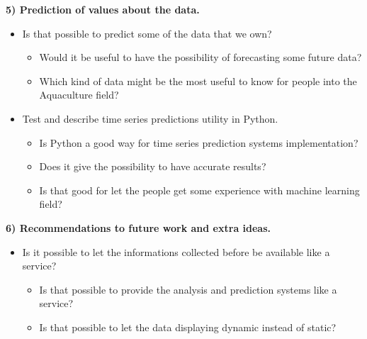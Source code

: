  \newpage
 
\textbf{5) Prediction of values about the data.}
\vspace{-5mm}
\begin{itemize}
 \setlength{\itemsep}{-5pt}
  \item Is that possible to predict some of the data that we own?
		\vspace{-3mm}
		\begin{itemize}
 		\setlength{\itemsep}{-5pt}		
		  \item Would it be useful to have the possibility of forecasting some future data?
		  \item Which kind of data might be the most useful to know for people into the Aquaculture field?
		 \end{itemize}
  \item Test and describe time series predictions utility in Python.
  		\vspace{-3mm}
		\begin{itemize}
 		\setlength{\itemsep}{-5pt}	
		  \item Is Python a good way for time series prediction systems implementation?
		  \item Does it give the possibility to have accurate results?
		  \item Is that good for let the people get some experience with machine learning field?
		\end{itemize}
 \end{itemize}

\textbf{6) Recommendations to future work and extra ideas.}
\vspace{-5mm}
\begin{itemize}
\setlength{\itemsep}{-5pt}
	\item Is it possible to let the informations collected before be available like a service?
  		\vspace{-3mm}
		\begin{itemize}
 		\setlength{\itemsep}{-5pt}	
		  	\item Is that possible to provide the analysis and prediction systems like a service?
		  	\item Is that possible to let the data displaying dynamic instead of static?
		\end{itemize}
 \end{itemize}




